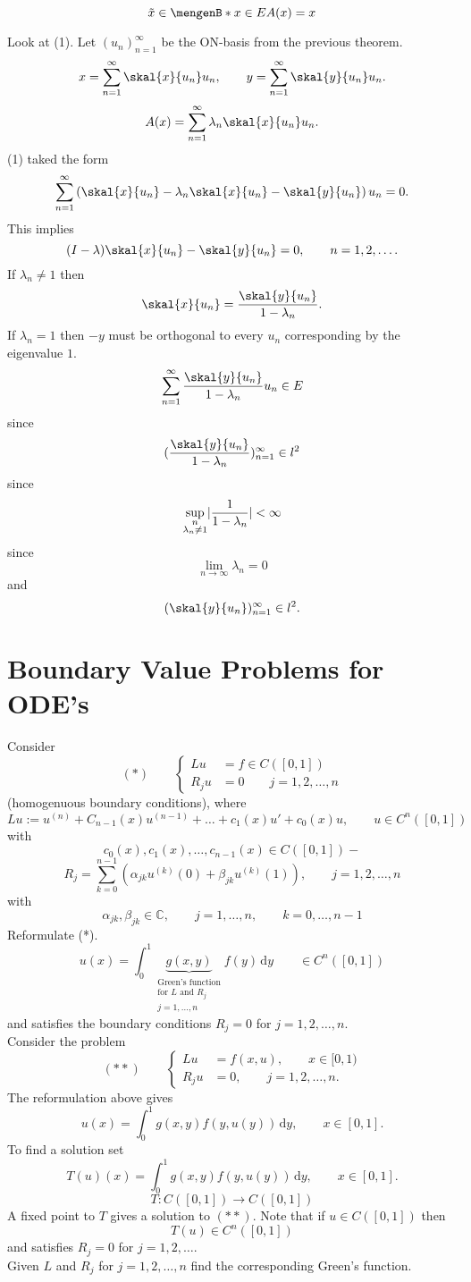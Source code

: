 \[
	\tilde x \in \set[x \in E]{A(x)=x}
\]
\begin{beweis}
	Look at (1). Let $(u_n)_{n=1}^{\infty}$ be the ON-basis from the previous theorem.
	\[
		x = \sum_{n=1}^{\infty}\skal{x}{u_n}u_n, \qquad y = \sum_{n=1}^{\infty}\skal{y}{u_n}u_n.
	\]
	\[
		A(x) = \sum_{n=1}^{\infty} \lambda_n \skal{x}{u_n}u_n.
	\]
	(1) taked the form
	\[
		\sum_{n=1}^{\infty} \left( \skal{x}{u_n} - \lambda_n \skal{x}{u_n} - \skal{y}{u_n} \right) u_n = 0.
	\]
	This implies 
	\[
		(I- \lambda)\skal{x}{u_n}- \skal{y}{u_n} = 0, \qquad n=1,2,\dots.
	\]
	If $\lambda_n \neq 1$ then
	\[
		\skal{x}{u_n} = \frac{\skal{y}{u_n}}{1 - \lambda_n}.
	\]
	If $\lambda_n = 1$ then $-y$ must be orthogonal to every $u_n$ corresponding by the eigenvalue $1$.
	\[
		\sum_{n=1}^{\infty} \frac{\skal{y}{u_n}}{1- \lambda_n}u_n \in E
	\]
	since
	\[
		(\frac{\skal{y}{u_n}}{1- \lambda_n})_{n=1}^{\infty} \in l^2
	\]
	since
	\[
		\sup_{\substack{n \\ \lambda_n \neq 1}} \lvert\frac{1}{1- \lambda_n}\rvert < \infty
	\]
	since
	\[
		\lim_{n \to \infty}\lambda_n = 0
	\]
	and
	\[
		(\skal{y}{u_n})_{n=1}^{\infty} \in l^2.
	\]
\end{beweis}
\newpage
\section{Boundary Value Problems for ODE's} 
\label{sec:boundary_value_problems_for_ode_s}
Consider
\[
	(*)\qquad \begin{cases}
		Lu &=f \in C([0,1]) \\
		R_ju &= 0 \qquad j=1,2,\dots,n 
	\end{cases}
\]
(homogenuous boundary conditions),
where
\[
	Lu := u^{(n)} + C_{n-1}(x)u^{(n-1)} + \dots + c_1(x)u' + c_0(x)u, \qquad u \in C^n([0,1])
\]
with
\[
	c_0(x),c_1(x), \dots, c_{n-1}(x) \in C([0,1])-
\]
\[
	R_j = \sum_{k=0}^{n-1} \left( \alpha_{jk} u^{(k)}(0) + \beta_{jk}u^{(k)}(1) \right), \qquad j=1,2,\dots,n
\]
with
\[
	\alpha_{jk}, \beta_{jk} \in \mathbb{C}, \qquad j=1,\dots,n, \qquad k=0,\dots,n-1
\]
Reformulate (*).
\[
	u(x) = \int_{0}^{1} \underset{\substack{\text{Green's function} \\ \text{for $L$ and $R_j$} \\ j=1,\dots,n}}{\underbrace{g(x,y)}}f(y) \,\mathrm{d}y \qquad \in C^n([0,1])
\]
and satisfies the boundary conditions $R_j = 0$ for $j=1,2,\dots,n$. \\
Consider the problem
\[
(**) \qquad 	\begin{cases}
		Lu &= f(x,u), \qquad x \in [0,1) \\
		R_ju &= 0, \qquad j=1,2,\dots,n.
		
	\end{cases}
\]
The reformulation above gives
\[
	u(x) = \int_{0}^{1}g(x,y)f(y,u(y)) \,\mathrm{d}y, \qquad x \in [0,1].
\]
To find a solution set
\[
	T(u)(x) = \int_{0}^{1}g(x,y)f(y,u(y)) \,\mathrm{d}y, \qquad x \in [0,1].
\]
\[
	T: C([0,1]) \to C([0,1])
\]
A fixed point to $T$ gives a solution to $(**)$. Note that if $u \in C([0,1])$ then
\[
	T(u) \in C^n([0,1]) 
\]
and satisfies $R_j=0$ for $j=1,2,\dots$. \\
Given $L$ and $R_j$ for $j=1,2,\dots,n$ find the corresponding Green's function.

